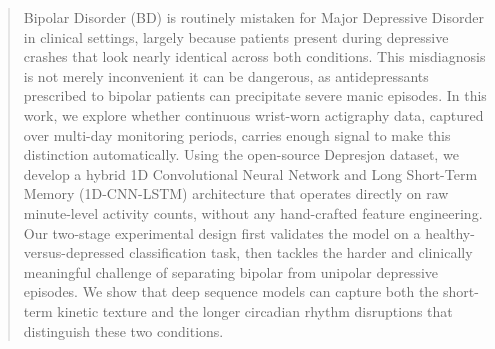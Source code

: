\begin{abstract}
Bipolar Disorder (BD) is routinely mistaken for Major Depressive Disorder in clinical settings, largely because patients present during depressive crashes that look nearly identical across both conditions. This misdiagnosis is not merely inconvenient it can be dangerous, as antidepressants prescribed to bipolar patients can precipitate severe manic episodes. In this work, we explore whether continuous wrist-worn actigraphy data, captured over multi-day monitoring periods, carries enough signal to make this distinction automatically. Using the open-source Depresjon dataset, we develop a hybrid 1D Convolutional Neural Network and Long Short-Term Memory (1D-CNN-LSTM) architecture that operates directly on raw minute-level activity counts, without any hand-crafted feature engineering. Our two-stage experimental design first validates the model on a healthy-versus-depressed classification task, then tackles the harder and clinically meaningful challenge of separating bipolar from unipolar depressive episodes. We show that deep sequence models can capture both the short-term kinetic texture and the longer circadian rhythm disruptions that distinguish these two conditions.

\end{abstract}
